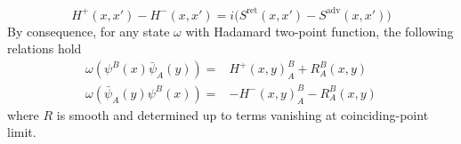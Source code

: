 \begin{equation*}
H^+(x,x') - H^-(x,x') = i\big(S^{\mathrm{ret}}(x,x') - S^{\mathrm{adv}}(x,x')\big)
\end{equation*}
By consequence, for any state $\omega$ with Hadamard two-point function, the following relations hold
\begin{equation*}
\begin{split}
\omega(\psi^B(x)\bar{\psi}_A(y)) = & H^+(x,y)^B_A + R^B_A(x,y) \\
\omega(\bar{\psi}_A(y)\psi^B(x)) = &- H^-(x,y)^B_A - R^B_A(x,y)
\end{split}
\end{equation*}
where $R$ is smooth and determined up to terms vanishing at coinciding-point limit.


















